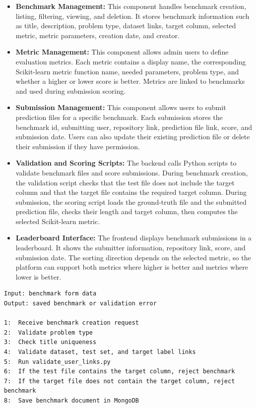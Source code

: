 \documentclass[12pt,a4paper]{report}
\begin{document}
\begin{itemize}
  \item \textbf{Benchmark Management:}
  This component handles benchmark creation, listing, filtering, viewing,
and deletion. It stores benchmark information such as title, description,
problem type, dataset links, target column, selected metric, metric parameters,
creation date, and creator.

  \item \textbf{Metric Management:}
  This component allows admin users to define evaluation metrics. Each
metric contains a display name, the corresponding Scikit-learn metric function
name, needed parameters, problem type, and whether a higher or lower score is
better. Metrics are linked to benchmarks and used during submission scoring.

  \item \textbf{Submission Management:}
  This component allows users to submit prediction files for a specific
benchmark. Each submission stores the benchmark id, submitting user, repository
link, prediction file link, score, and submission date. Users can also update
their existing prediction file or delete their submission if they have
permission.

  \item \textbf{Validation and Scoring Scripts:}
  The backend calls Python scripts to validate benchmark files and score
submissions. During benchmark creation, the validation script checks that the
test file does not include the target column and that the target file contains
the required target column. During submission, the scoring script loads the
ground-truth file and the submitted prediction file, checks their length and
target column, then computes the selected Scikit-learn metric.

  \item \textbf{Leaderboard Interface:}
  The frontend displays benchmark submissions in a leaderboard. It shows
the submitter information, repository link, score, and submission date. The
sorting direction depends on the selected metric, so the platform can support
both metrics where higher is better and metrics where lower is better.
\end{itemize}

\begin{lstlisting}[style=algostyle,caption={Benchmark creation flow}]
Input: benchmark form data
Output: saved benchmark or validation error

1:  Receive benchmark creation request
2:  Validate problem type
3:  Check title uniqueness
4:  Validate dataset, test set, and target label links
5:  Run validate_user_links.py
6:  If the test file contains the target column, reject benchmark
7:  If the target file does not contain the target column, reject benchmark
8:  Save benchmark document in MongoDB
\end{lstlisting}
\end{document}
